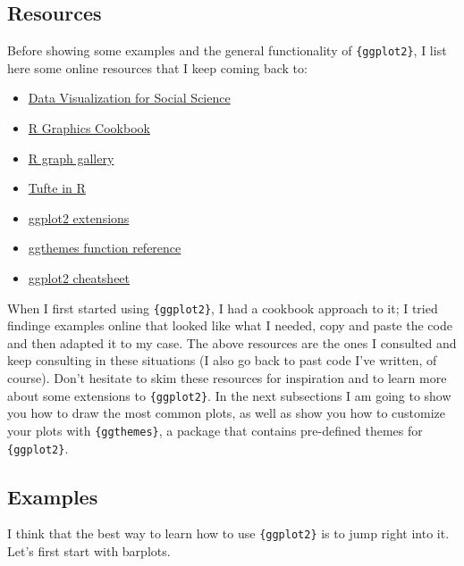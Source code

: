 \documentclass[
]{article}
\begin{document}
\hypertarget{resources}{%
\subsection{Resources}\label{resources}}

Before showing some examples and the general functionality of \texttt{\{ggplot2\}}, I list here some online
resources that I keep coming back to:

\begin{itemize}
\item
  \href{http://socviz.co/}{Data Visualization for Social Science}
\item
  \href{http://www.cookbook-r.com/Graphs/}{R Graphics Cookbook}
\item
  \href{http://www.r-graph-gallery.com/portfolio/ggplot2-package/}{R graph gallery}
\item
  \href{http://motioninsocial.com/tufte/}{Tufte in R}
\item
  \href{https://exts.ggplot2.tidyverse.org/}{ggplot2 extensions}
\item
  \href{https://jrnold.github.io/ggthemes/reference/index.html}{ggthemes function reference}
\item
  \href{https://raw.githubusercontent.com/rstudio/cheatsheets/main/data-visualization.pdf}{ggplot2 cheatsheet}
\end{itemize}

When I first started using \texttt{\{ggplot2\}}, I had a cookbook approach to it; I tried findinge examples
online that looked like what I needed, copy and paste the code and then adapted it to my case. The above resources
are the ones I consulted and keep consulting in these situations (I also go back to past code I've written, of
course). Don't hesitate to skim these resources for inspiration and to learn more about some
extensions to \texttt{\{ggplot2\}}. In the next subsections I am going to show you how to draw the most common
plots, as well as show you how to customize your plots with \texttt{\{ggthemes\}}, a package that contains pre-defined
themes for \texttt{\{ggplot2\}}.

\hypertarget{examples}{%
\subsection{Examples}\label{examples}}

I think that the best way to learn how to use \texttt{\{ggplot2\}} is to jump right into it. Let's first start with
barplots.
\end{document}
